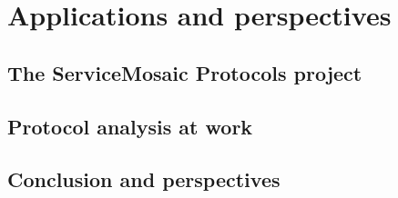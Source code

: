 
\part{Applications and perspectives}


\chapter{The ServiceMosaic Protocols project}
\label{chap:protocols-project}


\chapter{Protocol analysis at work}
\label{chap:sample-usecase}


\chapter{Conclusion and perspectives}
\label{chap:conclusion}


